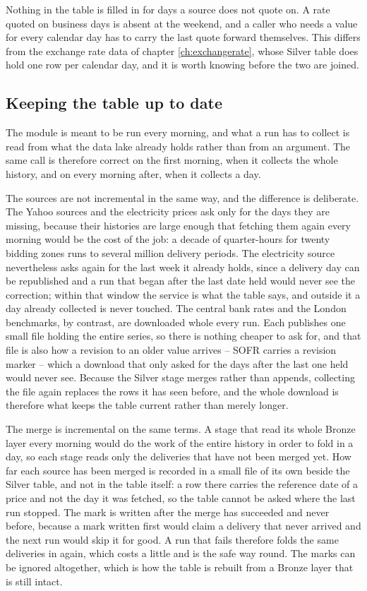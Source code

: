 Nothing in the table is filled in for days a source does not quote on. A rate quoted on business days is absent at the weekend, and a caller who needs a value for every calendar day has to carry the last quote forward themselves. This differs from the exchange rate data of chapter \ref{ch:exchangerate}, whose Silver table does hold one row per calendar day, and it is worth knowing before the two are joined.

\subsection{Keeping the table up to date}

The module is meant to be run every morning, and what a run has to collect is read from what the data lake already holds rather than from an argument. The same call is therefore correct on the first morning, when it collects the whole history, and on every morning after, when it collects a day.

The sources are not incremental in the same way, and the difference is deliberate. The Yahoo sources and the electricity prices ask only for the days they are missing, because their histories are large enough that fetching them again every morning would be the cost of the job: a decade of quarter-hours for twenty bidding zones runs to several million delivery periods. The electricity source nevertheless asks again for the last week it already holds, since a delivery day can be republished and a run that began after the last date held would never see the correction; within that window the service is what the table says, and outside it a day already collected is never touched. The central bank rates and the London benchmarks, by contrast, are downloaded whole every run. Each publishes one small file holding the entire series, so there is nothing cheaper to ask for, and that file is also how a revision to an older value arrives -- SOFR carries a revision marker -- which a download that only asked for the days after the last one held would never see. Because the Silver stage merges rather than appends, collecting the file again replaces the rows it has seen before, and the whole download is therefore what keeps the table current rather than merely longer.

The merge is incremental on the same terms. A stage that read its whole Bronze layer every morning would do the work of the entire history in order to fold in a day, so each stage reads only the deliveries that have not been merged yet. How far each source has been merged is recorded in a small file of its own beside the Silver table, and not in the table itself: a row there carries the reference date of a price and not the day it was fetched, so the table cannot be asked where the last run stopped. The mark is written after the merge has succeeded and never before, because a mark written first would claim a delivery that never arrived and the next run would skip it for good. A run that fails therefore folds the same deliveries in again, which costs a little and is the safe way round. The marks can be ignored altogether, which is how the table is rebuilt from a Bronze layer that is still intact.

